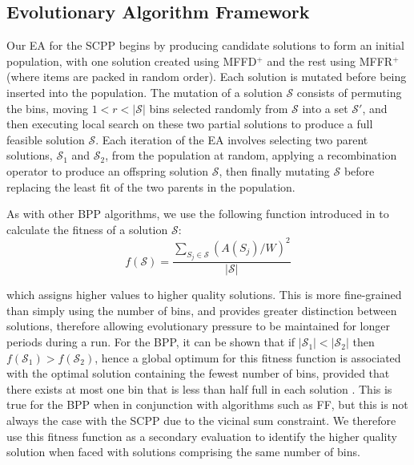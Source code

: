 \documentclass{IEEEtran}
\begin{document}
\subsection{Evolutionary Algorithm Framework}
\label{sub:eaframework}
Our EA for the SCPP begins by producing candidate solutions to form an initial population, with one solution created using MFFD$^+$ and the rest using MFFR$^+$ (where items are packed in random order). Each solution is mutated before being inserted into the population. The mutation of a solution $\mathcal{S}$ consists of permuting the bins, moving $1 < r < |\mathcal{S}|$ bins selected randomly from $\mathcal{S}$ into a set $\mathcal{S}'$, and then executing local search on these two partial solutions to produce a full feasible solution $\mathcal{S}$. Each iteration of the EA involves selecting two parent solutions, $\mathcal{S}_1$ and $\mathcal{S}_2$, from the population at random, applying a recombination operator to produce an offspring solution $\mathcal{S}$, then finally mutating $\mathcal{S}$ before replacing the least fit of the two parents in the population.

As with other BPP algorithms, we use the following function introduced in \cite{falkenauer1992} to calculate the fitness of a solution $\mathcal{S}$:
\begin{equation}
f(\mathcal{S}) = \frac{\sum_{S_j \in \mathcal{S}} (A(S_j)/W)^2}{|\mathcal{S}|}
\label{eqn:fitness}
\end{equation}

\noindent which assigns higher values to higher quality solutions. This is more fine-grained than simply using the number of bins, and provides greater distinction between solutions, therefore allowing evolutionary pressure to be maintained for longer periods during a run. For the BPP, it can be shown that if $|\mathcal{S}_1| < |\mathcal{S}_2|$  then $f(\mathcal{S}_1) > f(\mathcal{S}_2)$, hence a global optimum for this fitness function is associated with the optimal solution containing the fewest number of bins, provided that there exists at most one bin that is less than half full in each solution \cite{falkenauer1998}. This is true for the BPP when in conjunction with algorithms such as FF, but this is not always the case with the SCPP due to the vicinal sum constraint. We therefore use this fitness function as a secondary evaluation to identify the higher quality solution when faced with solutions comprising the same number of bins.
\end{document}
